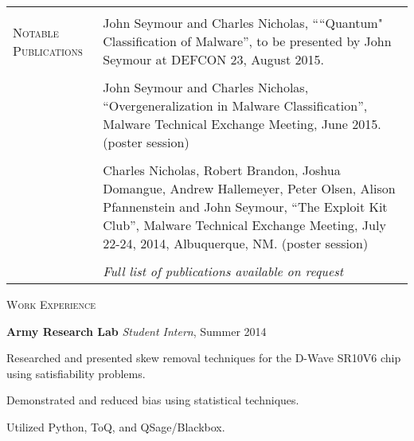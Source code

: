 \begin{tabular}{l p{340pt}}

&\\
\textsc{Notable Publications}
& John Seymour and Charles Nicholas, ````Quantum" Classification of Malware'', to be presented by John Seymour at DEFCON 23, August 2015.\\ \\
& John Seymour and Charles Nicholas, ``Overgeneralization in Malware Classification'', Malware Technical Exchange Meeting, June 2015. (poster session)\\ \\
& Charles Nicholas, Robert Brandon, Joshua Domangue, Andrew Hallemeyer, Peter Olsen, Alison Pfannenstein and John Seymour, ``The Exploit Kit Club'', Malware Technical Exchange Meeting, July 22-24, 2014, Albuquerque, NM.  (poster session)\\ \\
& \textit{Full list of publications available on request}
\end{tabular}
\textsc{Work Experience}

\medskip
\atab \textbf{Army Research Lab} \tab \textit{Student Intern}, Summer 2014\\
\begin{my_list}
\item Researched and presented skew removal techniques for the D-Wave SR10V6 chip\\ \tab \tab using satisfiability problems.
\item Demonstrated and reduced bias using statistical techniques.
\item Utilized Python, ToQ, and QSage/Blackbox.
\end{my_list}

